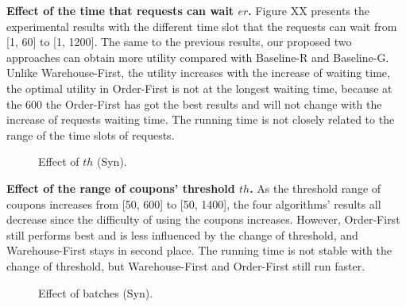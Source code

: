 \textbf{Effect of the time that requests can wait $er$.} Figure XX presents the experimental results with the different time slot that the requests can wait from [1, 60] to [1, 1200]. The same to the previous results, our proposed two approaches can obtain more utility compared with Baseline-R and Baseline-G. Unlike Warehouse-First, the utility increases with the increase of waiting time, the optimal utility in Order-First is not at the longest waiting time, because at the 600 the Order-First has got the best results and will not change with the increase of requests waiting time. The running time is not closely related to the range of the time slots of requests.

\begin{figure}[t!]\centering
	\subfigcapskip=-5pt
	\hfill
	\addtocounter{subfigure}{-1}\vspace{-3ex}
	\figureCaptionMargin
	\vspace{-1ex}
	\caption{\small Effect of $th$ (Syn).}\figureBelowMargin
	\label{fig:syn_11}
\end{figure}

\textbf{Effect of the range of coupons' threshold $th$.} As the threshold range of coupons increases from [50, 600] to [50, 1400], the four algorithms' results all decrease since the difficulty of using the coupons increases. However, Order-First still performs best and is less influenced by the change of threshold, and Warehouse-First stays in second place. The running time is not stable with the change of threshold, but Warehouse-First and Order-First still run faster.

\begin{figure}[t!]\centering
	\subfigcapskip=-5pt
	\hfill
	\addtocounter{subfigure}{-1}\vspace{-3ex}
	\figureCaptionMargin
	\vspace{-1ex}
	\caption{\small Effect of batches (Syn).}\figureBelowMargin
	\label{fig:syn_16}
\end{figure}

